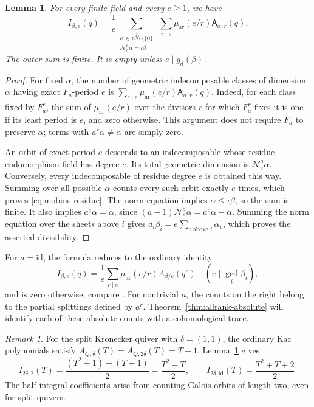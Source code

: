 \documentclass[11pt, reqno]{amsart}
\numberwithin{equation}{section}
\newtheorem{lemma}[theorem]{Lemma}
\theoremstyle{definition}
\theoremstyle{remark}
\newtheorem{remark}[theorem]{Remark}
\newcommand{\mr}[1]{\mathrm{#1}}
\newcommand{\mb}[1]{\mathbb{#1}}
\newcommand{\mc}[1]{\mathcal{#1}}
\newcommand{\Qbar}{\widetilde Q}
\begin{document}
\begin{lemma}\label{lem:mobius}
For every finite field and every $e\geq1$, we have
\begin{equation}\label{eq:mobius-residue} I_{\beta,e}(q)=\frac1e \sum_{\substack{\alpha\in\mb N^{\Qbar_0}\setminus\{0\}\\ \mc N_e^a\alpha=\iota\beta}} \ \sum_{r\mid e}\mu_{\mr{ar}}(e/r)\mathsf A_{\alpha,r}(q).\end{equation}
The outer sum is finite. It is empty unless $e\mid g_d(\beta)$.
\end{lemma}
\begin{proof}
For fixed $\alpha$, the number of geometric indecomposable classes
of dimension $\alpha$ having exact $F_a$-period $e$ is
$\sum_{r\mid e}\mu_{\mr{ar}}(e/r)\mathsf A_{\alpha,r}(q)$.
Indeed, for each class fixed by $F_a^e$, the sum of
$\mu_{\mr{ar}}(e/r)$ over the divisors $r$ for which $F_a^r$
fixes it is one if its least period is $e$, and zero otherwise.
This argument does not require $F_a$ to preserve $\alpha$; terms
with $a^r\alpha\ne\alpha$ are simply zero.

An orbit of exact period $e$ descends to an indecomposable whose
residue endomorphism field has degree $e$. Its total geometric
dimension is $\mc N_e^a\alpha$. Conversely, every
indecomposable of residue degree $e$ is obtained this way. Summing
over all possible $\alpha$ counts every such orbit exactly $e$
times, which proves \eqref{eq:mobius-residue}. The norm equation
implies $\alpha\leq\iota\beta$, so the sum is finite.
It also implies $a^e\alpha=\alpha$, since
$(a-1)\mc N_e^a\alpha=a^e\alpha-\alpha$.
Summing the norm equation over the sheets above $i$ gives
$d_i\beta_i=e\sum_{v\text{ above }i}\alpha_v$,
which proves the asserted divisibility.
\end{proof}

For $a=\mr{id}$, the formula reduces to the ordinary identity
\[ I_{\beta,e}(q)=\frac1e\sum_{r\mid e} \mu_{\mr{ar}}(e/r)A_{\beta/e}(q^r) \quad(e\mid\gcd_i\beta_i), \]
and is zero otherwise; compare \cite[Lemma~8.4.7]{DWbook}.
For nontrivial $a$, the counts on the right belong to the partial
splittings defined by $a^r$. Theorem~\ref{thm:allrank-absolute} will
identify each of these absolute counts with a cohomological trace.

\begin{remark}\label{rem:nonintegral-count}
For the split Kronecker quiver with $\delta=(1,1)$, the ordinary
Kac polynomials satisfy $A_{Q,\delta}(T)=A_{Q,2\delta}(T)=T+1$.
Lemma~\ref{lem:mobius} gives
\[ I_{2\delta,2}(T)=\frac{(T^2+1)-(T+1)}2=\frac{T^2-T}{2},\qquad
   I_{2\delta,\mr{id}}(T)=\frac{T^2+T+2}{2}. \]
The half-integral coefficients arise from counting Galois orbits
of length two, even for split quivers.
\end{remark}
\end{document}

